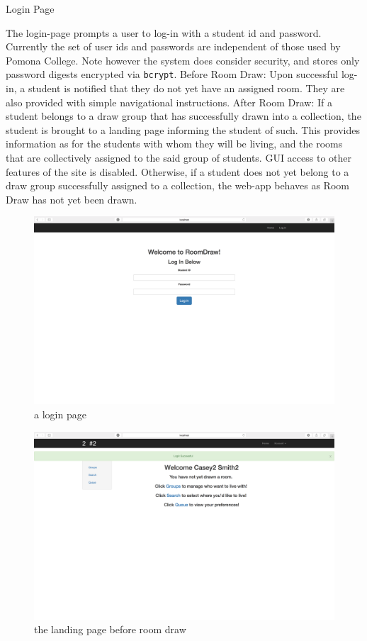 \begin{outline}
\1 Login Page
  
  \2 The login-page prompts a user to log-in with a student id and password.
  Currently the set of user ids and passwords are independent of those used by
  Pomona College. Note however the system does consider security, and stores
  only password digests encrypted via \texttt{bcrypt}.
  \2 Before Room Draw:
    \3 Upon successful log-in, a student is notified that they do not yet have
    an assigned room. They are also provided with simple navigational
    instructions.
  \2 After Room Draw:
    \3 If a student belongs to a draw group that has successfully drawn into a
    collection, the student is brought to a landing page informing the student
    of such. This provides information as for the students with whom they will
    be living, and the rooms that are collectively assigned to the said group of
    students. GUI access to other features of the site is disabled.
    \3 Otherwise, if a student does not yet belong to a draw group successfully
    assigned to a collection, the web-app behaves as Room Draw has not yet been
    drawn.
    
\begin{figure}[H] \centering
\includegraphics[scale=.225]{screens/login}
\caption{a login page}
\label{fig:screenlogin}
\end{figure}

\begin{figure}[H] \centering
\includegraphics[scale=.225]{screens/landing_undrawn}
\caption{the landing page before room draw}
\label{fig:screenlandingundrawn}
\end{figure}


\end{outline}
